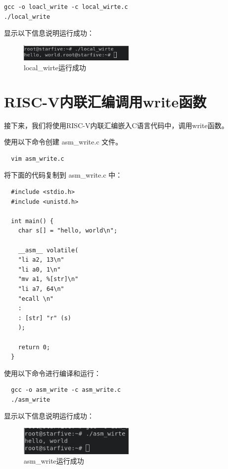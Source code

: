 \documentclass[lang=cn,10pt]{elegantbook}
\begin{document}
\begin{lstlisting}
gcc -o loacl_write -c local_wirte.c
./local_write
\end{lstlisting}

显示以下信息说明运行成功：
\begin{figure}[htbp]
  \centering
  \includegraphics[width=0.5\textwidth]{image/image-20231105134051213.png}
  \caption{local\_wirte运行成功}
\end{figure}

\section{RISC-V内联汇编调用write函数}
接下来，我们将使用RISC-V内联汇编嵌入C语言代码中，调用write函数。

使用以下命令创建 asm\_write.c 文件。

\begin{lstlisting}
  vim asm_write.c
\end{lstlisting}

将下面的代码复制到 asm\_write.c 中：

\begin{lstlisting}
  #include <stdio.h>
  #include <unistd.h>

  int main() {
    char s[] = "hello, world\n";

    __asm__ volatile(
    "li a2, 13\n"
    "li a0, 1\n"
    "mv a1, %[str]\n"
    "li a7, 64\n"	
    "ecall \n"
    :
    : [str] "r" (s)	
    );

    return 0;
  }
\end{lstlisting}

使用以下命令进行编译和运行：

\begin{lstlisting}
  gcc -o asm_write -c asm_write.c
  ./asm_write
\end{lstlisting}

显示以下信息说明运行成功：
\begin{figure}[htbp]
  \centering
  \includegraphics[width=0.5\textwidth]{image/image-20231105134323745.png}
  \caption{asm\_write运行成功}
\end{figure}
\end{document}
